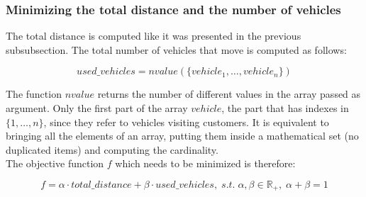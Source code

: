 \documentclass[../main.tex]{subfiles}
\begin{document}
\subsubsection{Minimizing the total distance and the number of vehicles}
\label{subsubsec:minimizing-total-distance-number-vehicles}
The total distance is computed like it was presented in the previous subsubsection. The total number of vehicles that move is computed as follows:
\begin{center}
    \begin{equation}
        used\_vehicles = nvalue(\{vehicle_1,\dots,vehicle_n\})
    \end{equation}
\end{center}
The function $nvalue$ returns the number of different values in the array passed as argument.
Only the first part of the array $vehicle$, the part that has indexes in $\{1,\dots,n\}$, since they refer to vehicles visiting customers.
It is equivalent to bringing all the elements of an array, putting them inside a mathematical set (no duplicated items) and computing the cardinality.\\
The objective function $f$ which needs to be minimized is therefore:
\begin{center}
    \begin{equation}
        f = \alpha{} \cdot total\_distance + \beta{} \cdot used\_vehicles, \; s.t. \; \alpha{}, \beta{} \in \mathbb{R}_+, \; \alpha{} + \beta{} = 1
    \end{equation}
\end{center}
\end{document}
